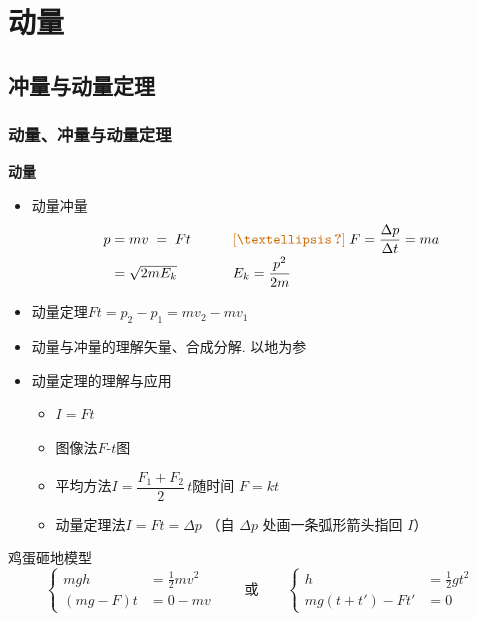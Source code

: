 \chapter{动量}
\label{ch:07}

\section{冲量与动量定理}
\subsection{动量、冲量与动量定理}
\textbf{动量}
\begin{itemize}
\item 动量\quad 冲量
  \[
  \begin{array}{ll}
  p=mv\;=\;Ft & \qquad \unclear{…}\;F=\dfrac{\Delta p}{\Delta t}=ma \\[6pt]
  \phantom{p}=\sqrt{2mE_k} & \qquad E_k=\dfrac{p^2}{2m}
  \end{array}
  \]
\item 动量定理\quad $Ft=p_2-p_1=mv_2-mv_1$
\end{itemize}

\begin{itemize}
\item 动量与冲量的理解\quad 矢量、合成分解. 以地为参 %
\item 动量定理的理解与应用
  \begin{itemize}
  \item $I=Ft$
  \item 图像法\quad $F$-$t$图
  \item 平均方法\quad $I=\dfrac{F_1+F_2}{2}\,t$\quad 随时间 $F=kt$
  \item 动量定理法\quad $I=Ft=\Delta p$ （自 $\Delta p$ 处画一条弧形箭头指回 $I$）
  \end{itemize}
\end{itemize}

鸡蛋砸地模型
\[ \left\{\begin{aligned} mgh&=\tfrac12mv^2\\ (mg-F)t&=0-mv \end{aligned}\right. \qquad\text{或}\qquad \left\{\begin{aligned} h&=\tfrac12gt^2\\ mg(t+t')-Ft'&=0 \end{aligned}\right. \]

